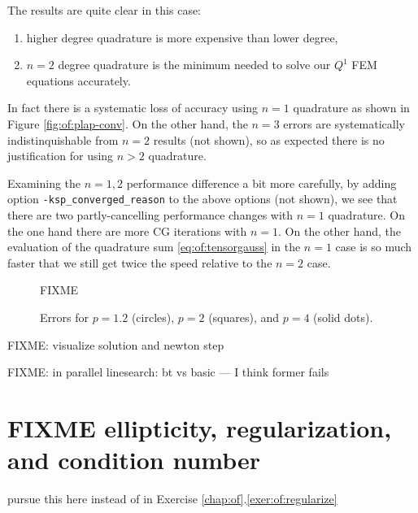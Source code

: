 The results are quite clear in this case:
\renewcommand{\labelenumi}{\emph{(\roman{enumi})}}
\begin{enumerate}
\item higher degree quadrature is more expensive than lower degree,
\item $n=2$ degree quadrature is the minimum needed to solve our $Q^1$ FEM equations accurately.
\end{enumerate}
In fact there is a systematic loss of accuracy using $n=1$ quadrature as shown in Figure \ref{fig:of:plap-conv}.  On the other hand, the $n=3$ errors are systematically indistinquishable from $n=2$ results (not shown), so as expected \citep{Elmanetal2005} there is no justification for using $n>2$ quadrature.

Examining the $n=1,2$ performance difference a bit more carefully, by adding option \texttt{-ksp\_converged\_reason} to the above options (not shown), we see that there are two partly-cancelling performance changes with $n=1$ quadrature.  On the one hand there are more CG iterations with $n=1$.  On the other hand, the evaluation of the quadrature sum \eqref{eq:of:tensorgauss} in the $n=1$ case is so much faster that we still get twice the speed relative to the $n=2$ case.

\begin{figure}
FIXME %
\caption{Errors for $p=1.2$ (circles), $p=2$ (squares), and $p=4$ (solid dots).}
\label{fig:of:plap-presults}
\end{figure}

FIXME: visualize solution and newton step

FIXME: in parallel linesearch: bt vs basic --- I think former fails


\section{FIXME ellipticity, regularization, and condition number}

pursue this here instead of in Exercise \ref{chap:of}.\ref{exer:of:regularize}

